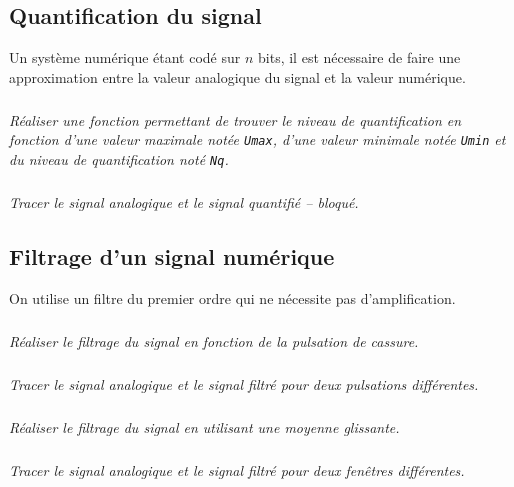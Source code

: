\documentclass[10pt,fleqn]{article} %
\begin{document}
\begin{multicols}{2}
\subsection*{Quantification du signal}
Un système numérique étant codé sur $n$ bits, il est nécessaire de faire une approximation entre la valeur analogique du signal et la valeur numérique. 

\subparagraph{}
\textit{Réaliser une fonction permettant de trouver le niveau de quantification en fonction d'une valeur maximale notée \texttt{Umax}, d'une valeur minimale notée \texttt{Umin} et du niveau de quantification noté \texttt{Nq}.}

\subparagraph{}
\textit{Tracer le signal analogique et le signal quantifié -- bloqué.}

\subsection*{Filtrage d'un signal numérique}
On utilise un filtre du premier ordre qui ne nécessite pas d'amplification. 

\subparagraph{}
\textit{Réaliser le filtrage du signal en fonction de la pulsation de cassure.}

\subparagraph{}
\textit{Tracer le signal analogique et le signal filtré pour deux pulsations différentes.}


\subparagraph{}
\textit{Réaliser le filtrage du signal en utilisant une moyenne glissante.}

\subparagraph{}
\textit{Tracer le signal analogique et le signal filtré pour deux fenêtres différentes.}


\end{multicols}
\end{document}
